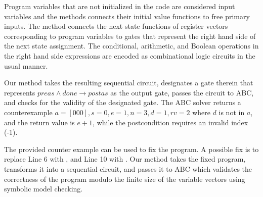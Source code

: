 Program variables that are not initialized in the code are considered
input variables and the methods connects their initial value functions 
to free primary inputs.
The method connects the next state functions of register vectors corresponding to 
program variables to gates that represent
the right hand side of the next state assignment.
The conditional, arithmetic, and Boolean operations in the right hand side
expressions are encoded as combinational logic circuits in the usual manner. 

Our method takes the resulting sequential circuit, designates a gate therein that 
represents $preas \wedge done \rightarrow postas$ as the output gate, passes
the circuit to ABC, and checks for the validity of the designated gate.
The ABC solver returns a counterexample $a=[0 0 0],s=0,e=1,n=3,d=1,rv=2$ 
where $d$ is not in $a$, and the return value is $e+1$, while the postcondition
requires an invalid index (-1). 

The provided counter example can be used to fix the program. 
A possible fix is to replace Line 6 with , and Line 10 with
.
Our method takes the fixed program, transforms it into a sequential circuit,
and passes it to ABC which validates the correctness of the program modulo the 
finite size of the variable vectors using symbolic model checking. 


